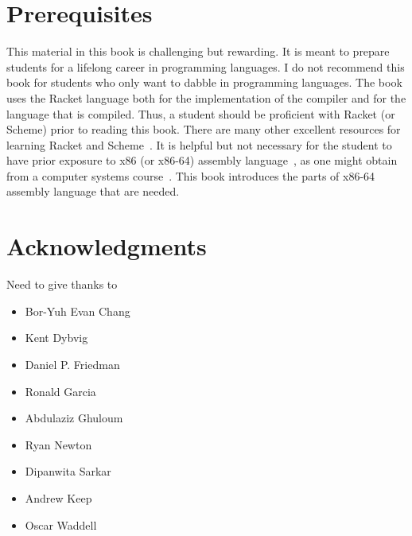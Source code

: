 \documentclass[11pt]{book}
\begin{document}
\section*{Prerequisites}

This material in this book is challenging but rewarding. It is meant
to prepare students for a lifelong career in programming languages.  I
do not recommend this book for students who only want to dabble in
programming languages.  The book uses the Racket language both for the
implementation of the compiler and for the language that is
compiled. Thus, a student should be proficient with Racket (or Scheme)
prior to reading this book. There are many other excellent resources
for learning Racket and
Scheme~\citep{Dybvig:1987aa,Abelson:1996uq,Friedman:1996aa,Felleisen:2001aa,Felleisen:2013aa,Flatt:2014aa}. It
is helpful but not necessary for the student to have prior exposure to
x86 (or x86-64) assembly language~\citep{Intel:2015aa}, as one might
obtain from a computer systems
course~\citep{Bryant:2005aa,Bryant:2010aa}.  This book introduces the
parts of x86-64 assembly language that are needed.



\section*{Acknowledgments}

Need to give thanks to 
\begin{itemize}
\item Bor-Yuh Evan Chang
\item Kent Dybvig
\item Daniel P. Friedman
\item Ronald Garcia
\item Abdulaziz Ghuloum
\item Ryan Newton
\item Dipanwita Sarkar
\item Andrew Keep
\item Oscar Waddell
\end{itemize}
\end{document}
